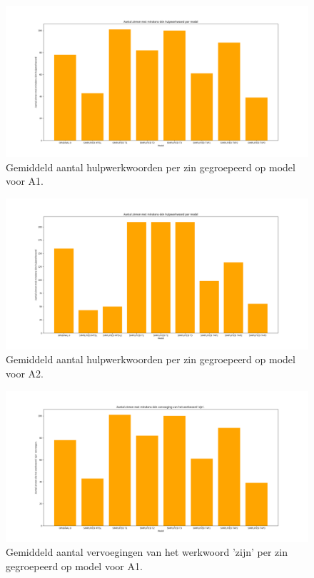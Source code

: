 \begin{figure}
	\includegraphics[width=\linewidth]{img/boxplot-aux-a1.png}
	\caption{Gemiddeld aantal hulpwerkwoorden per zin gegroepeerd op model voor A1.}
	\label{img:histplot-aux-a1}
\end{figure}

\begin{figure}
	\includegraphics[width=\linewidth]{img/boxplot-aux-a2.png}
	\caption{Gemiddeld aantal hulpwerkwoorden per zin gegroepeerd op model voor A2.}
	\label{img:histplot-aux-a2}
\end{figure}


\begin{figure}
	\includegraphics[width=\linewidth]{img/boxplot-tobe-a1.png}
	\caption{Gemiddeld aantal vervoegingen van het werkwoord 'zijn' per zin gegroepeerd op model voor A1.}
	\label{img:histplot-tobe-a1}
\end{figure}

